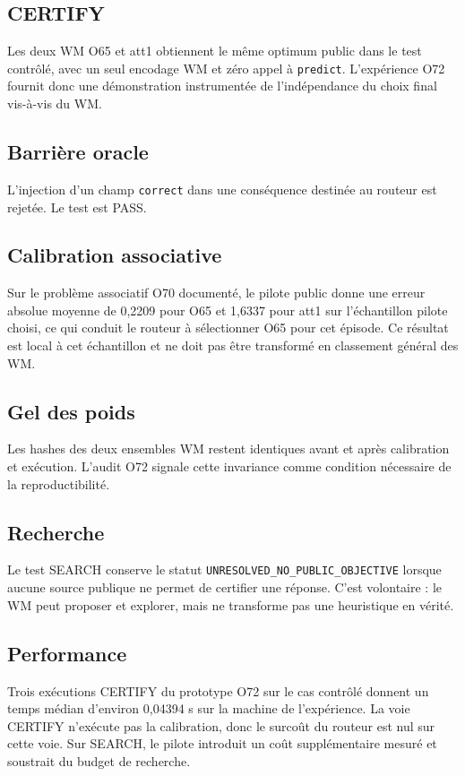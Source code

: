 \documentclass[11pt,a4paper]{article}
\begin{document}
\subsection{CERTIFY}
Les deux WM O65 et att1 obtiennent le même optimum public dans le test contrôlé, avec un seul encodage WM et zéro appel à \texttt{predict}. L'expérience O72 fournit donc une démonstration instrumentée de l'indépendance du choix final vis-à-vis du WM.
\subsection{Barrière oracle}
L'injection d'un champ \texttt{correct} dans une conséquence destinée au routeur est rejetée. Le test est PASS.
\subsection{Calibration associative}
Sur le problème associatif O70 documenté, le pilote public donne une erreur absolue moyenne de 0,2209 pour O65 et 1,6337 pour att1 sur l'échantillon pilote choisi, ce qui conduit le routeur à sélectionner O65 pour cet épisode. Ce résultat est local à cet échantillon et ne doit pas être transformé en classement général des WM.
\subsection{Gel des poids}
Les hashes des deux ensembles WM restent identiques avant et après calibration et exécution. L'audit O72 signale cette invariance comme condition nécessaire de la reproductibilité.
\subsection{Recherche}
Le test SEARCH conserve le statut \texttt{UNRESOLVED\_NO\_PUBLIC\_OBJECTIVE} lorsque aucune source publique ne permet de certifier une réponse. C'est volontaire : le WM peut proposer et explorer, mais ne transforme pas une heuristique en vérité.
\subsection{Performance}
Trois exécutions CERTIFY du prototype O72 sur le cas contrôlé donnent un temps médian d'environ 0,04394 s sur la machine de l'expérience. La voie CERTIFY n'exécute pas la calibration, donc le surcoût du routeur est nul sur cette voie. Sur SEARCH, le pilote introduit un coût supplémentaire mesuré et soustrait du budget de recherche.
\end{document}
